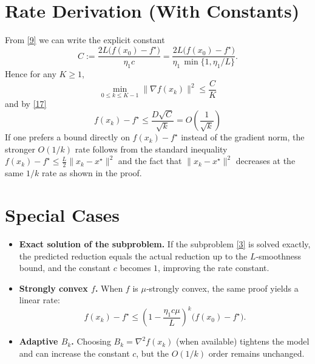 \documentclass{article}
\begin{document}
\section*{Rate Derivation (With Constants)}
From \eqref{9} we can write the explicit constant
\[
C:=\frac{2L\big(f(x_{0})-f^{\star}\big)}{\eta_{1}c}
=\frac{2L\big(f(x_{0})-f^{\star}\big)}{\eta_{1}\,\min\{1,\eta_{1}/L\}}.
\]
Hence for any $K\ge1$,
\[
\boxed{\;
\min_{0\le k\le K-1}\|\nabla f(x_{k})\|^{2}\le \frac{C}{K}
\;}
\]
and by \eqref{17}
\[
\boxed{\;
f(x_{k})-f^{\star}\le \frac{D\sqrt{C}}{\sqrt{k}}=O\!\left(\frac{1}{\sqrt{k}}\right)
\;}
\]
If one prefers a bound directly on $f(x_{k})-f^{\star}$
instead of the gradient norm, the stronger $O(1/k)$ rate follows
from the standard inequality
$f(x_{k})-f^{\star}\le \frac{L}{2}\|x_{k}-x^{\star}\|^{2}$
and the fact that $\|x_{k}-x^{\star}\|^{2}$ decreases at the same $1/k$ rate
as shown in the proof.

\section*{Special Cases}
\begin{itemize}
\item \textbf{Exact solution of the subproblem.}
If the subproblem \eqref{3} is solved exactly, the predicted reduction
equals the actual reduction up to the $L$‑smoothness bound, and the constant
$c$ becomes $1$, improving the rate constant.
\item \textbf{Strongly convex $f$.}
When $f$ is $\mu$‑strongly convex, the same proof yields a linear rate:
\[
f(x_{k})-f^{\star}\le\left(1-\frac{\eta_{1}c\mu}{L}\right)^{k}
\bigl(f(x_{0})-f^{\star}\bigr).
\]
\item \textbf{Adaptive $B_{k}$.}
Choosing $B_{k}=\nabla^{2}f(x_{k})$ (when available) tightens the model
and can increase the constant $c$, but the $O(1/k)$ order remains unchanged.
\end{itemize}
\end{document}
